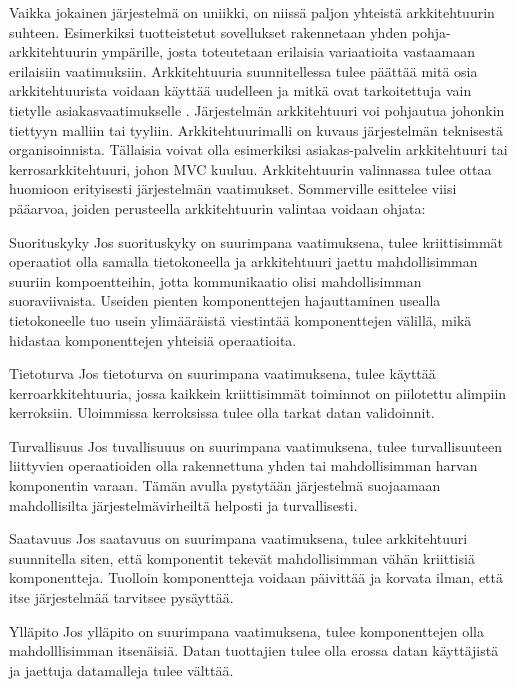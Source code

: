 \documentclass[utf8]{gradu3}
\begin{document}
Vaikka jokainen järjestelmä on uniikki, on niissä paljon yhteistä arkkitehtuurin suhteen. Esimerkiksi tuotteistetut sovellukset rakennetaan yhden pohja-arkkitehtuurin ympärille, josta toteutetaan erilaisia variaatioita vastaamaan erilaisiin vaatimuksiin. Arkkitehtuuria suunnitellessa tulee päättää mitä osia arkkitehtuurista voidaan käyttää uudelleen ja mitkä ovat tarkoitettuja vain tietylle asiakasvaatimukselle \parencite[s. 151]{Sommerville}. Järjestelmän arkkitehtuuri voi pohjautua johonkin tiettyyn malliin tai tyyliin. Arkkitehtuurimalli on kuvaus järjestelmän teknisestä organisoinnista. Tällaisia voivat olla esimerkiksi asiakas-palvelin arkkitehtuuri tai kerrosarkkitehtuuri, johon MVC kuuluu. Arkkitehtuurin valinnassa tulee ottaa huomioon erityisesti järjestelmän vaatimukset. Sommerville \parencite[s.152]{Sommerville} esittelee viisi pääarvoa, joiden perusteella arkkitehtuurin valintaa voidaan ohjata:

\begin{desclist}
\item[Suorituskyky] Jos suorituskyky on suurimpana vaatimuksena, tulee kriittisimmät operaatiot olla samalla tietokoneella ja arkkitehtuuri jaettu mahdollisimman suuriin kompoentteihin, jotta kommunikaatio olisi mahdollisimman suoraviivaista. Useiden pienten komponenttejen hajauttaminen usealla tietokoneelle tuo usein ylimääräistä viestintää komponenttejen välillä, mikä hidastaa komponenttejen yhteisiä operaatioita. 
\item[Tietoturva] Jos tietoturva on suurimpana vaatimuksena, tulee käyttää kerroarkkitehtuuria, jossa kaikkein kriittisimmät toiminnot on piilotettu alimpiin kerroksiin. Uloimmissa kerroksissa tulee olla tarkat datan validoinnit. 
\item[Turvallisuus] Jos tuvallisuuus on suurimpana vaatimuksena, tulee turvallisuuteen liittyvien operaatioiden olla rakennettuna yhden tai mahdollisimman harvan komponentin varaan. Tämän avulla pystytään järjestelmä suojaamaan mahdollisilta järjestelmävirheiltä helposti ja turvallisesti.
\item[Saatavuus] Jos saatavuus on suurimpana vaatimuksena, tulee arkkitehtuuri suunnitella siten, että komponentit tekevät mahdollisimman vähän kriittisiä komponentteja. Tuolloin komponentteja voidaan päivittää ja korvata ilman, että itse järjestelmää tarvitsee pysäyttää. 
\item[Ylläpito] Jos ylläpito on suurimpana vaatimuksena, tulee komponenttejen olla mahdolllisimman itsenäisiä. Datan tuottajien tulee olla erossa datan käyttäjistä ja jaettuja datamalleja tulee välttää.
\end{desclist}
\end{document}
